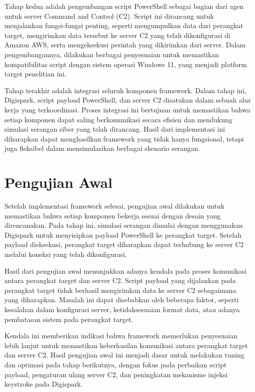 Tahap kedua adalah pengembangan script PowerShell sebagai bagian dari agen untuk server Command and Control (C2). Script ini dirancang untuk menjalankan fungsi-fungsi penting, seperti mengumpulkan data dari perangkat target, mengirimkan data tersebut ke server C2 yang telah dikonfigurasi di Amazon AWS, serta mengeksekusi perintah yang dikirimkan dari server. Dalam pengembangannya, dilakukan berbagai penyesuaian untuk memastikan kompatibilitas script dengan sistem operasi Windows 11, yang menjadi platform target penelitian ini.


Tahap terakhir adalah integrasi seluruh komponen framework. Dalam tahap ini, Digispark, script payload PowerShell, dan server C2 disatukan dalam sebuah alur kerja yang terkoordinasi. Proses integrasi ini bertujuan untuk memastikan bahwa setiap komponen dapat saling berkomunikasi secara efisien dan mendukung simulasi serangan siber yang telah dirancang. Hasil dari implementasi ini diharapkan dapat menghasilkan framework yang tidak hanya fungsional, tetapi juga fleksibel dalam mensimulasikan berbagai skenario serangan.

\section{Pengujian Awal}
Setelah implementasi framework selesai, pengujian awal dilakukan untuk memastikan bahwa setiap komponen bekerja sesuai dengan desain yang direncanakan. Pada tahap ini, simulasi serangan dimulai dengan menggunakan Digispark untuk menyisipkan payload PowerShell ke perangkat target. Setelah payload dieksekusi, perangkat target diharapkan dapat terhubung ke server C2 melalui koneksi yang telah dikonfigurasi.


Hasil dari pengujian awal menunjukkan adanya kendala pada proses komunikasi antara perangkat target dan server C2. Script payload yang dijalankan pada perangkat target tidak berhasil mengirimkan data ke server C2 sebagaimana yang diharapkan. Masalah ini dapat disebabkan oleh beberapa faktor, seperti kesalahan dalam konfigurasi server, ketidaksesuaian format data, atau adanya pembatasan sistem pada perangkat target.


Kendala ini memberikan indikasi bahwa framework memerlukan penyesuaian lebih lanjut untuk memastikan keberhasilan komunikasi antara perangkat target dan server C2. Hasil pengujian awal ini menjadi dasar untuk melakukan tuning dan optimasi pada tahap berikutnya, dengan fokus pada perbaikan script payload, pengaturan ulang server C2, dan peningkatan mekanisme injeksi keystroke pada Digispark.

